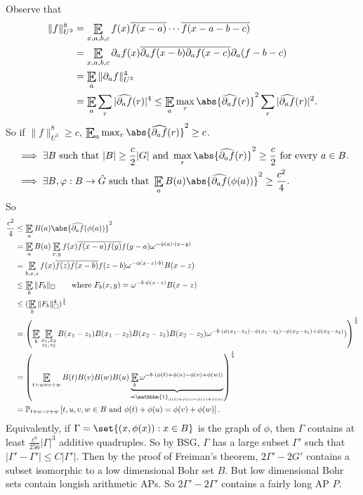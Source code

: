 \documentclass{article}
\DeclareMathOperator*{\E}{\scalerel*{\mathbb{E}}{\textstyle\sum}}
\newcommand{\1}[1]{\mathbbm{1}_{#1}}
\begin{document}
Observe that
\begin{align*}
  \|f\|^8_{U^3} &= \E_{x,a,b,c} f(x) \overline{f(x-a)} \dotsm \overline{f(x-a-b-c)}  \\
                &= \E_{x,a,b,c} \partial_a f(x) \overline{\partial_a f(x-b)} \overline{\partial_a f(x-c)} \partial_a(f-b-c) \\
                &= \E_a \|\partial_a f\|^4_{U^2} \\
                &= \E_a \sum_r |\widehat{\partial_a f}(r)|^4 \leq \E_a \max_{r} \abs{\widehat{\partial_a f}(r)}^2 \sum_r |\widehat{\partial_a f}(r)|^2.
\end{align*}
So if $\|f\|^8_{U^3} \geq c$, $\E_a \max_r \abs{\widehat{\partial_a f}(r)}^2 \geq c$.
\begin{align*}
  &\implies \exists B \text{ such that } |B| \geq \frac{c}{2} |G| \text{ and } \max_r \abs{\widehat{\partial_a f}(r)}^2 \geq \frac{c}{2} \text{ for every } a \in B. \\
  &\implies \exists B, \varphi: B \to \hat{G} \text{ such that } \E_a B(a) \abs{\widehat{\partial_a f}(\phi(a))}^2 \geq \frac{c^2}{4}.
\end{align*}
So
\begin{align*}
  \frac{c^2}{4} &\leq \E_a B(a) \abs{\widehat{\partial_a f}(\phi(a))}^2 \\
                &= \E_a B(a) \E_{x,y} f(x) \overline{f(x-a)} \overline{f(y)} f(y-a) \omega^{-\phi(a) \cdot (x-y)} \\
                &= \E_{b,x,z} f(x) \overline{f(z)} \overline{f(x-b)} f(z-b) \omega^{-\phi(x-z) \cdot b)} B(x-z) \\
                &\leq \E_b \|F_b\|_\square \qquad \text{where } F_b(x,y) = \omega^{-b \cdot \phi(x-z)} B(x-z) \\
                &\leq (\E_b \|F_b\|_\square^4)^{\frac{1}{4}} \\
                &= \left(\E_b \E_{\substack{x_1,x_2 \\ z_1,z_2}} B(x_1-z_1) B(x_1-z_2) B(x_2-z_1) B(x_2-z_2) \omega^{-b \cdot (\phi(x_1-z_1) - \phi(x_1-z_2) - \phi(x_2-z_1) + \phi(x_2-z_2)})\right)^\frac{1}{4} \\
                &= \left(\E_{t+u=v+w} B(t) B(v) B(w) B(u) \underbrace{\E_b \omega^{-b \cdot (\phi(t) + \phi(u) - \phi(v) + \phi(w))}}_{=\mathbbm{1}_{\phi(t) + \phi(u) = \phi(v) + \phi(w)}}\right)^\frac{1}{4} \\
                &= \mathbb{P}_{t+u=v+w} \left[t,u,v,w \in B \text{ and } \phi(t) + \phi(u) = \phi(v) + \phi(w)\right].
\end{align*}
Equivalently, if $\Gamma = \set{(x,\phi(x)) : x \in B}$ is the graph of $\phi$, then $\Gamma$ contains at least $\frac{c^8}{256} |\Gamma|^3$ additive quadruples.
So by BSG, $\Gamma$ has a large subset $\Gamma'$ such that $|\Gamma' - \Gamma'| \leq C |\Gamma'|$.
Then by the proof of Freiman's theorem, $2 \Gamma' - 2G'$ contains a subset isomorphic to a low dimensional Bohr set $B$.
But low dimensional Bohr sets contain longish arithmetic APs.
So $2\Gamma' - 2\Gamma'$ contains a fairly long AP $P$.
\end{document}
